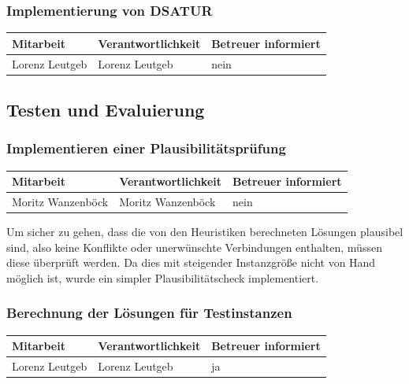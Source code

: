 \subsubsection{Implementierung von DSATUR}

\begin{center}
\begin{tabular}{lll}
	Mitarbeit & Verantwortlichkeit & Betreuer informiert \\
	\hline
	Lorenz Leutgeb & Lorenz Leutgeb & nein \\
\end{tabular}
\end{center}

\subsection{Testen und Evaluierung}

\subsubsection{Implementieren einer Plausibilitätsprüfung}

\begin{center}
\begin{tabular}{lll}
	Mitarbeit & Verantwortlichkeit & Betreuer informiert \\
	\hline
	Moritz Wanzenböck & Moritz Wanzenböck & nein \\
\end{tabular}
\end{center}

Um sicher zu gehen, dass die von den Heuristiken berechneten Lösungen plausibel sind, also keine Konflikte oder unerwünschte Verbindungen enthalten, müssen diese überprüft werden. Da dies mit steigender Instanzgröße nicht von Hand möglich ist, wurde ein simpler Plausibilitätscheck implementiert.

\subsubsection{Berechnung der Lösungen für Testinstanzen}

\begin{center}
\begin{tabular}{lll}
	Mitarbeit & Verantwortlichkeit & Betreuer informiert \\
	\hline
	Lorenz Leutgeb & Lorenz Leutgeb & ja \\
\end{tabular}
\end{center}

